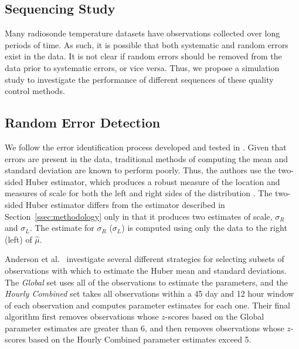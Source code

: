 \documentclass[12pt]{article}
\begin{document}
\begin{doublespacing}
\section{Sequencing Study}

Many radiosonde temperature datasets have observations collected over long periods of time.  As such, it is possible that both systematic and random errors exist in the data.  It is not clear if random errors should be removed from the data prior to systematic errors, or vice versa.  Thus, we propose a simulation study to investigate the performance of different sequences of these quality control methods.

\subsection{Random Error Detection}
\label{sec:ranErr}
We follow the error identification process developed and tested in \cite{bell14}.  Given that errors are present in the data, traditional methods of computing the mean and standard deviation are known to perform poorly.  Thus, the authors use the two-sided Huber estimator, which produces a robust measure of the location and measures of scale for both the left and right sides of the distribution \cite{huber11}.  The two-sided Huber estimator differs from the estimator described in Section~\ref{ssec:methodology} only in that it produces two estimates of scale, $\sigma_R$ and $\sigma_L$.  The estimate for $\sigma_R$ ($\sigma_L$) is computed using only the data to the right (left) of $\hat{\mu}$.

Anderson et al.~\cite{bell14} investigate several different strategies for selecting subsets of observations with which to estimate the Huber mean and standard deviations.  The \emph{Global} set uses all of the observations to estimate the parameters, and the \emph{Hourly Combined} set takes all observations within  a 45 day and 12 hour window of each observation and computes parameter estimates for each one.  Their final algorithm first removes observations whose $z$-scores based on the Global parameter estimates are greater than 6, and then removes observations whose $z$-scores  based on the Hourly Combined parameter estimates exceed 5.  



\end{doublespacing}
\end{document}
